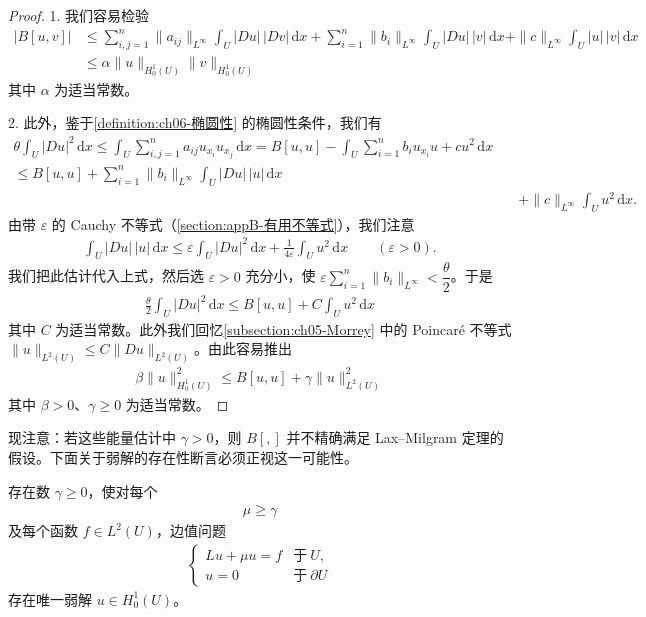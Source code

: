 \documentclass[../../main.tex]{subfiles}
\begin{document}
\begin{proof}
1. 我们容易检验
\begin{align*}
|B[u,v]|
&\leqslant\sum_{i,j=1}^{n}\|a_{ij}\|_{L^{\infty}}\int_{U}|Du|\,|Dv|\,\mathrm{d}x
+\sum_{i=1}^{n}\|b_{i}\|_{L^{\infty}}\int_{U}|Du|\,|v|\,\mathrm{d}x
+\|c\|_{L^{\infty}}\int_{U}|u|\,|v|\,\mathrm{d}x\\
&\leqslant\alpha\|u\|_{H^{1}_{0}(U)}\|v\|_{H^{1}_{0}(U)}
\end{align*}
其中 $\alpha$ 为适当常数。

2. 此外，鉴于\cref{definition:ch06-椭圆性} 的椭圆性条件，我们有
{\small\begin{align}
\theta\int_{U}|Du|^{2}\,\mathrm{d}x
\leqslant\int_{U}\sum_{i,j=1}^{n}a_{ij}u_{x_{i}}u_{x_{j}}\,\mathrm{d}x
=B[u,u]-\int_{U}\sum_{i=1}^{n}b_{i}u_{x_{i}}u+cu^{2}\,\mathrm{d}x\nonumber\\
\leqslant B[u,u]+\sum_{i=1}^{n}\|b_{i}\|_{L^{\infty}}\int_{U}|Du|\,|u|\,\mathrm{d}x\nonumber\\
&\quad+\|c\|_{L^{\infty}}\int_{U}u^{2}\,\mathrm{d}x.
\end{align}}
由带 $\varepsilon$ 的 Cauchy 不等式（\cref{section:appB-有用不等式}），我们注意
\begin{align*}
\int_{U}|Du|\,|u|\,\mathrm{d}x\leqslant\varepsilon\int_{U}|Du|^{2}\,\mathrm{d}x+\frac{1}{4\varepsilon}\int_{U}u^{2}\,\mathrm{d}x\qquad (\varepsilon>0).
\end{align*}
我们把此估计代入上式，然后选 $\varepsilon>0$ 充分小，使 $\varepsilon\sum_{i=1}^{n}\|b_{i}\|_{L^{\infty}}<\dfrac{\theta}{2}$。于是
\begin{align*}
\frac{\theta}{2}\int_{U}|Du|^{2}\,\mathrm{d}x\leqslant B[u,u]+C\int_{U}u^{2}\,\mathrm{d}x
\end{align*}
其中 $C$ 为适当常数。此外我们回忆\cref{subsection:ch05-Morrey} 中的 Poincaré 不等式 $\|u\|_{L^{2}(U)}\leqslant C\|Du\|_{L^{2}(U)}$。由此容易推出
\begin{align*}
\beta\|u\|_{H^{1}_{0}(U)}^{2}\leqslant B[u,u]+\gamma\|u\|_{L^{2}(U)}^{2}
\end{align*}
其中 $\beta>0$、$\gamma\geqslant 0$ 为适当常数。
\end{proof}

现注意：若这些能量估计中 $\gamma>0$，则 $B[,]$ 并不精确满足 Lax--Milgram 定理的假设。下面关于弱解的存在性断言必须正视这一可能性。

\begin{theorem}[弱解的第一存在定理]\label{theorem:ch06-第一存在定理}存在数 $\gamma\geqslant 0$，使对每个
\begin{align}
\mu\geqslant\gamma
\end{align}
及每个函数 $f\in L^{2}(U)$，边值问题
\begin{align}
\begin{cases}
Lu+\mu u=f & \text{于}\ U,\\
u=0 & \text{于}\ \partial U
\end{cases}
\end{align}
存在唯一弱解 $u\in H^{1}_{0}(U)$。
\end{theorem}
\end{document}
